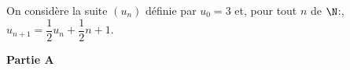 
\medskip

On considère la suite $\left(u_n\right)$ définie par $u_0 = 3$ et, pour tout $n$ de $\N$:,
$u_{n+1} = \dfrac12u_n + \dfrac12n + 1$.

\bigskip

\textbf{Partie A}

\medskip




